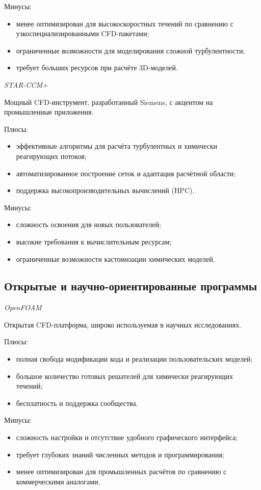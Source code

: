 Минусы:
\begin{itemize}
    \item менее оптимизирован для высокоскоростных течений по сравнению с узкоспециализированными CFD-пакетами;
    \item ограниченные возможности для моделирования сложной турбулентности;
    \item требует больших ресурсов при расчёте 3D-моделей.
\end{itemize}

\textit{STAR-CCM+}

Мощный CFD-инструмент, разработанный Siemens, с акцентом на промышленные приложения.

Плюсы:
\begin{itemize}
    \item эффективные алгоритмы для расчёта турбулентных и химически реагирующих потоков;
    \item автоматизированное построение сеток и адаптация расчётной области;
    \item поддержка высокопроизводительных вычислений (HPC).
\end{itemize}

Минусы:
\begin{itemize}
    \item сложность освоения для новых пользователей;
    \item высокие требования к вычислительным ресурсам;
    \item ограниченные возможности кастомизации химических моделей.
\end{itemize}

\subsection{Открытые и научно-ориентированные программы} 

\textit{OpenFOAM}

Открытая CFD-платформа, широко используемая в научных исследованиях.

Плюсы:
\begin{itemize}
    \item полная свобода модификации кода и реализации пользовательских моделей;
    \item большое количество готовых решателей для химически реагирующих течений;
    \item бесплатность и поддержка сообщества.
\end{itemize}

Минусы:
\begin{itemize}
    \item сложность настройки и отсутствие удобного графического интерфейса;
    \item требует глубоких знаний численных методов и программирования;
    \item менее оптимизирован для промышленных расчётов по сравнению с коммерческими аналогами.
\end{itemize}

